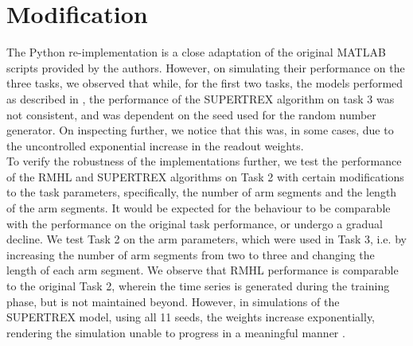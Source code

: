 \section{Modification}

The Python re-implementation is a close adaptation of the original MATLAB scripts provided by the authors. However, on simulating their performance on the three tasks, we observed that while, for the first two tasks, the models performed as described in \textcite{pyle2019}, the performance of the SUPERTREX algorithm on task 3 was not consistent, and was dependent on the seed used for the random number generator. On inspecting further, we notice that this was, in some cases, due to the uncontrolled exponential increase in the readout weights.\\

To verify the robustness of the implementations further, we test the performance of the RMHL and SUPERTREX algorithms on Task 2 with certain modifications to the task parameters, specifically, the number of arm segments and the length of the arm segments. It would be expected for the behaviour to be comparable with the performance on the original task performance, or undergo a gradual decline. We test Task 2 on the arm parameters, which were used in Task 3, i.e. by increasing the number of arm segments from two to three and changing the length of each arm segment. We observe that RMHL performance is comparable to the original Task 2, wherein the time series is generated during the training phase, but is not maintained beyond. However, in simulations of the SUPERTREX model, using all 11 seeds, the weights increase exponentially, rendering the simulation unable to progress in a meaningful manner . \\
    



